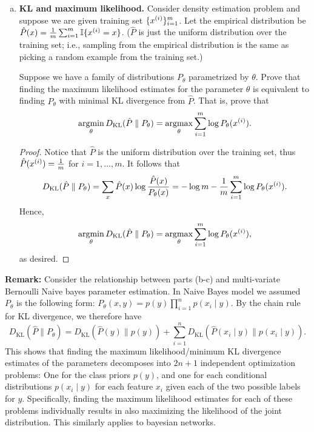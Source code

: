 \documentclass[12pt,letterpaper,boxed]{hmcpset}
\newcommand{\ind}[1]{\mathbb{I}\{#1\}}
\DeclareMathOperator*{\argmax}{argmax}
\DeclareMathOperator*{\argmin}{argmin}
\newcommand{\DKL}[2]{D_{\mathrm{KL}}(#1 \parallel #2)}
\begin{document}
\begin{solution}
\begin{enumerate}[(a)]
    \item \textbf{KL and maximum likelihood.} Consider density estimation problem and suppose we are given training set $\{\xx\}_{i=1}^m$. Let the empirical distribution be $\hat P(x) = \frac{1}{m} \sum_{i=1}^{m} \ind{\xx = x}$. ($\hat P$ is just the uniform distribution over the training set; i.e., sampling from the empirical distribution is the same as picking a random example from the training set.)
    
    Suppose we have a family of distributions $P_\theta$ parametrized by $\theta$. Prove that finding the maximum likelihood estimates for the parameter $\theta$ is equivalent to finding $P_\theta$ with minimal KL divergence from $\hat P$. That is, prove that
    \[
    \argmin_\theta \DKL{\hat P}{P_\theta} = \argmax_\theta \sum_{i=1}^m \log P_\theta (\xx).
    \]

    \begin{proof}
      Notice that $\hat P$ is the uniform distribution over the training set, thus $\hat P(\xx) = \frac{1}{m}$ for $i = 1, \dots, m$. It follows that
      \[
      \DKL{\hat P}{P_\theta} = \sum_x \hat P(x) \log \frac{\hat P(x)}{P_\theta(x)} = - \log m - \frac{1}{m} \sum_{i=1}^m \log P_\theta(\xx).
      \]
      Hence,
      \[
      \argmin_\theta \DKL{\hat P}{P_\theta} = \argmax_\theta \sum_{i=1}^m \log P_\theta (\xx),
      \]
      as desired.
    \end{proof}
  \end{enumerate}
\end{solution}

\begin{remark}
  \textbf{Remark:} Consider the relationship between parts (b-c) and multi-variate Bernoulli Naive bayes parameter estimation. In Naive Bayes model we assumed $P_\theta$ is the following form: $P_\theta(x,y) = p(y) \prod_{i=1}^n p(x_i \mid y)$. By the chain rule for KL divergence, we therefore have  
  \[
  \DKL{\hat P}{P_\theta} = \DKL{\hat P(y)}{p(y)} + \sum_{i=1}^n \DKL{\hat P(x_i \mid y)}{p(x_i \mid y)}.
  \]
  This shows that finding the maximum likelihood/minimum KL divergence estimates of the parameters decomposes into $2n+1$ independent optimization problems: One for the class priors $p(y)$, and one for each conditional distributions $p(x_i \mid y)$ for each feature $x_i$ given each of the two possible labels for $y$. Specifically, finding the maximum likelihood estimates for each of these problems individually results in also maximizing the likelihood of the joint distribution. This similarly applies to bayesian networks.
\end{remark}
\end{document}
